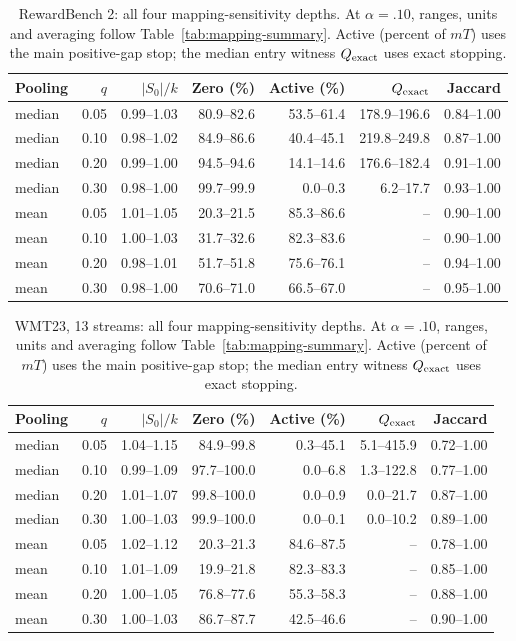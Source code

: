 \begin{table}[t]
\centering\small
\begin{tabular}{lrrrrrr}
\toprule
Pooling & $q$ & $|S_0|/k$ & Zero (\%) & Active (\%) & $Q_{\rm exact}$ & Jaccard \\
\midrule
median & 0.05 & 0.99--1.03 & 80.9--82.6 & 53.5--61.4 & 178.9--196.6 & 0.84--1.00 \\
median & 0.10 & 0.98--1.02 & 84.9--86.6 & 40.4--45.1 & 219.8--249.8 & 0.87--1.00 \\
median & 0.20 & 0.99--1.00 & 94.5--94.6 & 14.1--14.6 & 176.6--182.4 & 0.91--1.00 \\
median & 0.30 & 0.98--1.00 & 99.7--99.9 & 0.0--0.3 & 6.2--17.7 & 0.93--1.00 \\
mean & 0.05 & 1.01--1.05 & 20.3--21.5 & 85.3--86.6 & -- & 0.90--1.00 \\
mean & 0.10 & 1.00--1.03 & 31.7--32.6 & 82.3--83.6 & -- & 0.90--1.00 \\
mean & 0.20 & 0.98--1.01 & 51.7--51.8 & 75.6--76.1 & -- & 0.94--1.00 \\
mean & 0.30 & 0.98--1.00 & 70.6--71.0 & 66.5--67.0 & -- & 0.95--1.00 \\
\bottomrule
\end{tabular}
\caption{RewardBench 2: all four mapping-sensitivity depths. At $\alpha=.10$, ranges, units and averaging follow Table~\ref{tab:mapping-summary}. Active (percent of $mT$) uses the main positive-gap stop; the median entry witness $Q_{\rm exact}$ uses exact stopping.}
\label{tab:mapping-all-0}
\end{table}

\begin{table}[t]
\centering\small
\begin{tabular}{lrrrrrr}
\toprule
Pooling & $q$ & $|S_0|/k$ & Zero (\%) & Active (\%) & $Q_{\rm exact}$ & Jaccard \\
\midrule
median & 0.05 & 1.04--1.15 & 84.9--99.8 & 0.3--45.1 & 5.1--415.9 & 0.72--1.00 \\
median & 0.10 & 0.99--1.09 & 97.7--100.0 & 0.0--6.8 & 1.3--122.8 & 0.77--1.00 \\
median & 0.20 & 1.01--1.07 & 99.8--100.0 & 0.0--0.9 & 0.0--21.7 & 0.87--1.00 \\
median & 0.30 & 1.00--1.03 & 99.9--100.0 & 0.0--0.1 & 0.0--10.2 & 0.89--1.00 \\
mean & 0.05 & 1.02--1.12 & 20.3--21.3 & 84.6--87.5 & -- & 0.78--1.00 \\
mean & 0.10 & 1.01--1.09 & 19.9--21.8 & 82.3--83.3 & -- & 0.85--1.00 \\
mean & 0.20 & 1.00--1.05 & 76.8--77.6 & 55.3--58.3 & -- & 0.88--1.00 \\
mean & 0.30 & 1.00--1.03 & 86.7--87.7 & 42.5--46.6 & -- & 0.90--1.00 \\
\bottomrule
\end{tabular}
\caption{WMT23, 13 streams: all four mapping-sensitivity depths. At $\alpha=.10$, ranges, units and averaging follow Table~\ref{tab:mapping-summary}. Active (percent of $mT$) uses the main positive-gap stop; the median entry witness $Q_{\rm exact}$ uses exact stopping.}
\label{tab:mapping-all-1}
\end{table}

